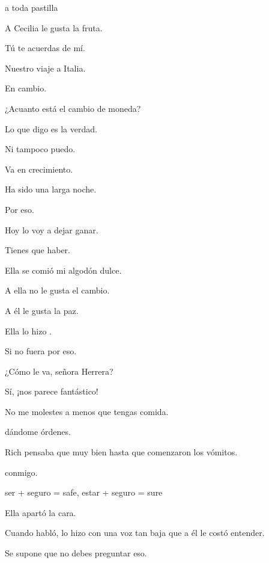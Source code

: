 a toda pastilla

\bsk
A Cecilia le gusta la fruta.

\sk
Tú te acuerdas de mí.

\sk
Nuestro viaje a Italia.

\sk
En cambio. 

\sk
¿Acuanto está el cambio de moneda?

\sk
Lo que digo es la verdad.

\sk
Ni tampoco puedo. 

\sk
Va en crecimiento. 

\sk
Ha sido una larga noche.

\sk
Por eso. 

\sk
Hoy lo voy a dejar ganar.

\sk
Tienes que haber. 

\sk
Ella se comió mi algodón dulce. 

\sk
A ella no le gusta el cambio.

\sk
A él le gusta la paz.

\sk
Ella lo hizo . 

\sk
Si no fuera por eso. 

\sk
¿Cómo le va, señora Herrera?

\sk
Sí, ¡nos parece fantástico! 

\sk
No me molestes a menos que tengas comida. 

\sk
{} dándome órdenes. 

\sk
Rich pensaba que  muy bien hasta que comenzaron los vómitos. 

\sk
{} conmigo. 

\sk
ser + seguro = safe, estar + seguro = sure

\sk
Ella apartó la cara. 

\sk
Cuando habló, lo hizo con una voz tan baja que a él le costó entender. 

\sk
Se supone que no debes preguntar eso. 

